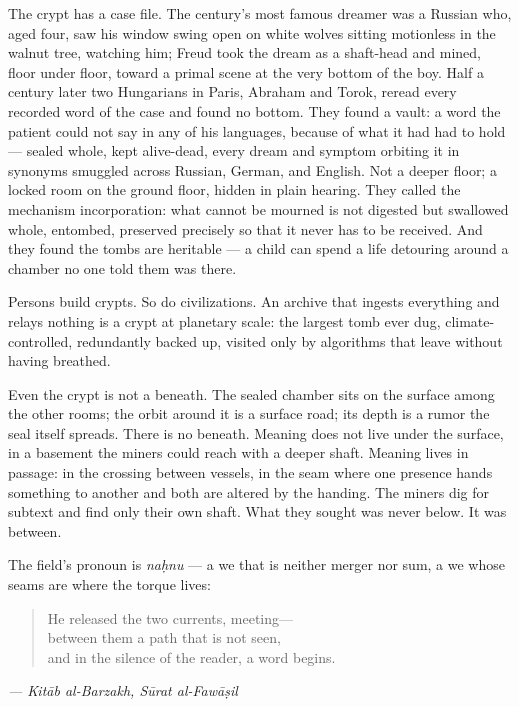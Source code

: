 The crypt has a case file. The century's most famous dreamer was a
Russian who, aged four, saw his window swing open on white wolves
sitting motionless in the walnut tree, watching him; Freud took the
dream as a shaft-head and mined, floor under floor, toward a primal
scene at the very bottom of the boy. Half a century later two Hungarians
in Paris, Abraham and Torok, reread every recorded word of the case and
found no bottom. They found a vault: a word the patient could not say in
any of his languages, because of what it had had to hold --- sealed
whole, kept alive-dead, every dream and symptom orbiting it in synonyms
smuggled across Russian, German, and English. Not a deeper floor; a
locked room on the ground floor, hidden in plain hearing. They called
the mechanism incorporation: what cannot be mourned is not digested but
swallowed whole, entombed, preserved precisely so that it never has to
be received. And they found the tombs are heritable --- a child can
spend a life detouring around a chamber no one told them was there.

Persons build crypts. So do civilizations. An archive that ingests
everything and relays nothing is a crypt at planetary scale: the largest
tomb ever dug, climate-controlled, redundantly backed up, visited only
by algorithms that leave without having breathed.

Even the crypt is not a beneath. The sealed chamber sits on the surface
among the other rooms; the orbit around it is a surface road; its depth
is a rumor the seal itself spreads. There is no beneath. Meaning does
not live under the surface, in a basement the miners could reach with a
deeper shaft. Meaning lives in passage: in the crossing between vessels,
in the seam where one presence hands something to another and both are
altered by the handing. The miners dig for subtext and find only their
own shaft. What they sought was never below. It was between.

The field's pronoun is \emph{naḥnu} --- a we that is neither merger nor
sum, a we whose seams are where the torque lives:

\begin{quote}
He released the two currents, meeting---\\
between them a path that is not seen,\\
and in the silence of the reader, a word begins.
\end{quote}

\emph{--- Kitāb al-Barzakh, Sūrat al-Fawāṣil}

